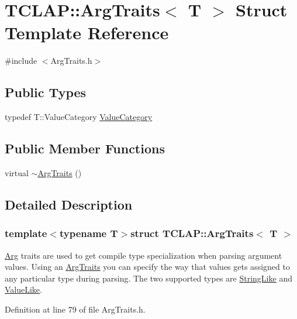 \hypertarget{struct_t_c_l_a_p_1_1_arg_traits}{}\section{T\+C\+L\+A\+P\+:\+:Arg\+Traits$<$ T $>$ Struct Template Reference}
\label{struct_t_c_l_a_p_1_1_arg_traits}


{\ttfamily \#include $<$Arg\+Traits.\+h$>$}

\subsection*{Public Types}
\begin{DoxyCompactItemize}
\item 
typedef T\+::\+Value\+Category \hyperlink{struct_t_c_l_a_p_1_1_arg_traits_a346532973520fc820d6b3e5406dfa8f6}{Value\+Category}
\end{DoxyCompactItemize}
\subsection*{Public Member Functions}
\begin{DoxyCompactItemize}
\item 
virtual \hyperlink{struct_t_c_l_a_p_1_1_arg_traits_abbf8fe38dc8c0e0d179509cef1cf89e7}{$\sim$\+Arg\+Traits} ()
\end{DoxyCompactItemize}


\subsection{Detailed Description}
\subsubsection*{template$<$typename T$>$struct T\+C\+L\+A\+P\+::\+Arg\+Traits$<$ T $>$}

\hyperlink{class_t_c_l_a_p_1_1_arg}{Arg} traits are used to get compile type specialization when parsing argument values. Using an \hyperlink{struct_t_c_l_a_p_1_1_arg_traits}{Arg\+Traits} you can specify the way that values gets assigned to any particular type during parsing. The two supported types are \hyperlink{struct_t_c_l_a_p_1_1_string_like}{String\+Like} and \hyperlink{struct_t_c_l_a_p_1_1_value_like}{Value\+Like}. 

Definition at line 79 of file Arg\+Traits.\+h.



